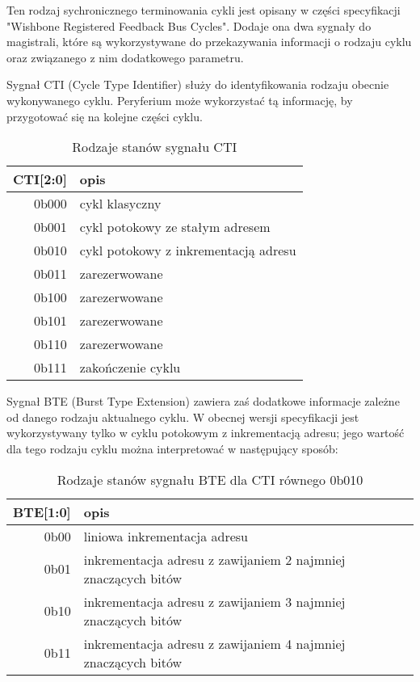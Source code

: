 
Ten rodzaj sychronicznego terminowania cykli jest opisany w części specyfikacji "Wishbone Registered Feedback Bus Cycles". Dodaje ona dwa sygnały do magistrali, które są wykorzystywane do przekazywania informacji o rodzaju cyklu oraz związanego z nim dodatkowego parametru.

Sygnał CTI (Cycle Type Identifier) służy do identyfikowania rodzaju obecnie wykonywanego cyklu. Peryferium może wykorzystać tą informację, by przygotować się na kolejne części cyklu.
\begin{table}
\begin{center}
\begin{tabular}{ r|l }
 CTI[2:0] & opis \\ 
 \hline
 0b000 & cykl klasyczny \\
 0b001 & cykl potokowy ze stałym adresem \\
 0b010 & cykl potokowy z inkrementacją adresu \\
 0b011 & zarezerwowane \\
 0b100 & zarezerwowane \\
 0b101 & zarezerwowane \\
 0b110 & zarezerwowane \\
 0b111 & zakończenie cyklu \\
 \hline
\end{tabular}
\end{center}
\caption{\label{tab:signal-states-cti}Rodzaje stanów sygnału CTI}
\end{table}

Sygnał BTE (Burst Type Extension) zawiera zaś dodatkowe informacje zależne od danego rodzaju aktualnego cyklu.
W obecnej wersji specyfikacji jest wykorzystywany tylko w cyklu potokowym z inkrementacją adresu; jego wartość dla tego rodzaju cyklu można interpretować w następujący sposób:

\begin{table}
\begin{center}
\begin{tabular}{ r|l }
 BTE[1:0] & opis \\ 
 \hline
 0b00 & liniowa inkrementacja adresu \\
 0b01 & inkrementacja adresu z zawijaniem 2 najmniej znaczących bitów \\
 0b10 & inkrementacja adresu z zawijaniem 3 najmniej znaczących bitów \\
 0b11 & inkrementacja adresu z zawijaniem 4 najmniej znaczących bitów \\
 \hline
\end{tabular}
\end{center}
\caption{\label{tab:signal-states-bte}Rodzaje stanów sygnału BTE dla CTI równego 0b010}
\end{table}

